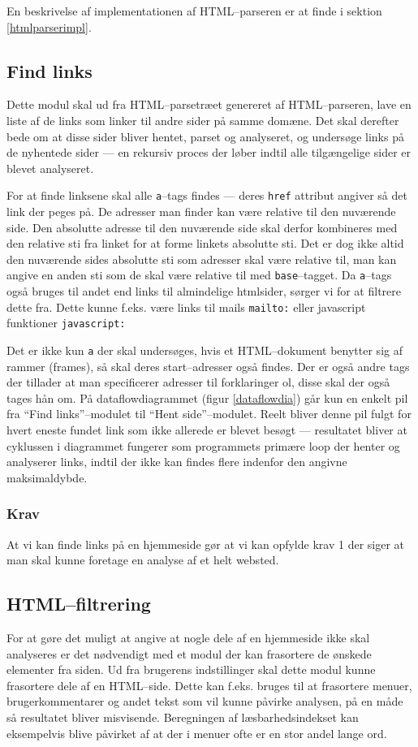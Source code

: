 \documentclass[a4paper,oneside]{memoir}
\begin{document}
En beskrivelse af implementationen af HTML--parseren er at finde i
sektion \ref{htmlparserimpl}.

\subsection{Find links}
Dette modul skal ud fra HTML--parsetræet genereret af HTML--parseren,
lave en liste af de links som linker til andre sider på samme domæne.
Det skal derefter bede om at disse sider bliver hentet, parset og
analyseret, og undersøge links på de nyhentede sider --- en rekursiv
proces der løber indtil alle tilgængelige sider er blevet analyseret.

For at finde linksene skal alle \texttt{a}--tags findes --- deres
\texttt{href} attribut angiver så det link der peges på. De adresser
man finder kan være relative til den nuværende side. Den absolutte
adresse til den nuværende side skal derfor kombineres med den relative
sti fra linket for at forme linkets absolutte sti. Det er dog ikke
altid den nuværende sides absolutte sti som adresser skal være
relative til, man kan angive en anden sti som de skal være relative
til med \texttt{base}--tagget. Da \texttt{a}--tags også bruges til andet 
end links til almindelige htmlsider, sørger vi for at filtrere dette fra. 
Dette kunne f.eks. være links til mails \texttt{mailto:} eller javascript
funktioner \texttt{javascript:}

Det er ikke kun \texttt{a} der skal undersøges, hvis et HTML--dokument
benytter sig af rammer (frames), så skal deres start--adresser også
findes. Der er også andre tags der tillader at man specificerer
adresser til forklaringer ol, disse skal der også tages hån om.
\label{cyklus}
  På dataflowdiagrammet (figur \ref{dataflowdia}) går kun en enkelt pil fra
``Find links''--modulet til ``Hent side''--modulet. Reelt bliver denne pil fulgt
for hvert eneste
fundet link som ikke allerede er blevet besøgt --- resultatet bliver at
cyklussen i diagrammet fungerer som programmets primære loop der
henter og analyserer links, indtil der ikke kan findes flere indenfor
den angivne maksimaldybde.

\subsubsection*{Krav}
At vi kan finde links på en hjemmeside gør at vi kan opfylde krav 1
der siger at man skal kunne foretage en analyse af et helt websted.

\subsection{HTML--filtrering}
For at gøre det muligt at angive at nogle dele af en hjemmeside ikke
skal analyseres er det nødvendigt med et modul der kan frasortere de
ønskede elementer fra siden. Ud fra brugerens indstillinger skal dette
modul kunne frasortere dele af en HTML--side. Dette kan f.eks. bruges
til at frasortere menuer, brugerkommentarer og andet tekst som vil
kunne påvirke analysen, på en måde så resultatet bliver
misvisende. Beregningen af læsbarhedsindekset kan eksempelvis blive
påvirket af at der i menuer ofte er en stor andel lange ord.
\end{document}
